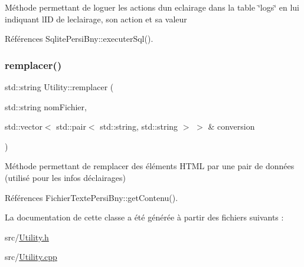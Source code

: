 Méthode permettant de loguer les actions d\textquotesingle{}un eclairage dans la table \char`\"{}logs\char`\"{} en lui indiquant l\textquotesingle{}ID de l\textquotesingle{}eclairage, son action et sa valeur 

Références Sqlite\+Persi\+Bny\+::executer\+Sql().

\mbox{\label{classUtility_a954a0d1bb807e5aa0c3d7c7d1059c5fb}} 
\subsubsection{\texorpdfstring{remplacer()}{remplacer()}}
{\footnotesize\ttfamily std\+::string Utility\+::remplacer (\begin{DoxyParamCaption}\item[{std\+::string}]{nom\+Fichier,  }\item[{std\+::vector$<$ std\+::pair$<$ std\+::string, std\+::string $>$ $>$ \&}]{conversion }\end{DoxyParamCaption})\hspace{0.3cm}{\ttfamily [static]}}

Méthode permettant de remplacer des éléments H\+T\+ML par une pair de données (utilisé pour les infos d\textquotesingle{}éclairages) 

Références Fichier\+Texte\+Persi\+Bny\+::get\+Contenu().



La documentation de cette classe a été générée à partir des fichiers suivants \+:\begin{DoxyCompactItemize}
\item 
src/\hyperlink{Utility_8h}{Utility.\+h}\item 
src/\hyperlink{Utility_8cpp}{Utility.\+cpp}\end{DoxyCompactItemize}
